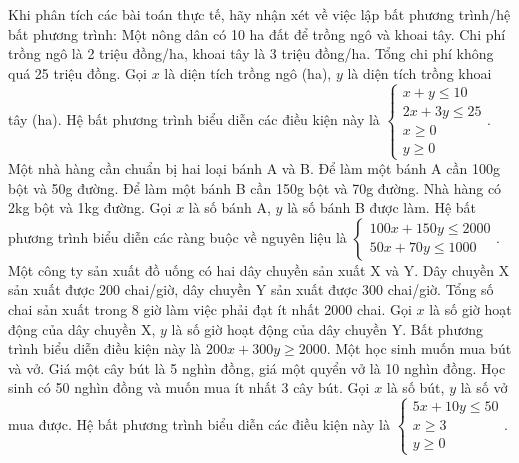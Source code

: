 \begin{ex}
Khi phân tích các bài toán thực tế, hãy nhận xét về việc lập bất phương trình/hệ bất phương trình:
\choiceTF
{Một nông dân có 10 ha đất để trồng ngô và khoai tây. Chi phí trồng ngô là 2 triệu đồng/ha, khoai tây là 3 triệu đồng/ha. Tổng chi phí không quá 25 triệu đồng. Gọi $x$ là diện tích trồng ngô (ha), $y$ là diện tích trồng khoai tây (ha). Hệ bất phương trình biểu diễn các điều kiện này là $\begin{cases} x + y \le 10 \\ 2x + 3y \le 25 \\ x \ge 0 \\ y \ge 0 \end{cases}$.}
{Một nhà hàng cần chuẩn bị hai loại bánh A và B. Để làm một bánh A cần 100g bột và 50g đường. Để làm một bánh B cần 150g bột và 70g đường. Nhà hàng có 2kg bột và 1kg đường. Gọi $x$ là số bánh A, $y$ là số bánh B được làm. Hệ bất phương trình biểu diễn các ràng buộc về nguyên liệu là $\begin{cases} 100x + 150y \le 2000 \\ 50x + 70y \le 1000 \end{cases}$.}
{Một công ty sản xuất đồ uống có hai dây chuyền sản xuất X và Y. Dây chuyền X sản xuất được 200 chai/giờ, dây chuyền Y sản xuất được 300 chai/giờ. Tổng số chai sản xuất trong 8 giờ làm việc phải đạt ít nhất 2000 chai. Gọi $x$ là số giờ hoạt động của dây chuyền X, $y$ là số giờ hoạt động của dây chuyền Y. Bất phương trình biểu diễn điều kiện này là $200x + 300y \ge 2000$.}
{Một học sinh muốn mua bút và vở. Giá một cây bút là 5 nghìn đồng, giá một quyển vở là 10 nghìn đồng. Học sinh có 50 nghìn đồng và muốn mua ít nhất 3 cây bút. Gọi $x$ là số bút, $y$ là số vở mua được. Hệ bất phương trình biểu diễn các điều kiện này là $\begin{cases} 5x + 10y \le 50 \\ x \ge 3 \\ y \ge 0 \end{cases}$.}
\end{ex}

